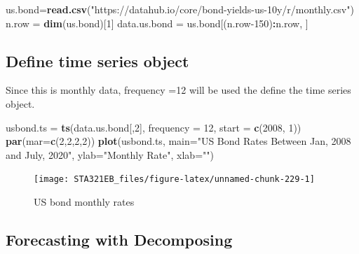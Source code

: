 \documentclass[
]{book}
\newenvironment{Shaded}{\begin{snugshade}}{\end{snugshade}}
\newcommand{\AttributeTok}[1]{\textcolor[rgb]{0.13,0.29,0.53}{#1}}
\newcommand{\DecValTok}[1]{\textcolor[rgb]{0.00,0.00,0.81}{#1}}
\newcommand{\FunctionTok}[1]{\textcolor[rgb]{0.13,0.29,0.53}{\textbf{#1}}}
\newcommand{\NormalTok}[1]{#1}
\newcommand{\OtherTok}[1]{\textcolor[rgb]{0.56,0.35,0.01}{#1}}
\newcommand{\SpecialCharTok}[1]{\textcolor[rgb]{0.81,0.36,0.00}{\textbf{#1}}}
\newcommand{\StringTok}[1]{\textcolor[rgb]{0.31,0.60,0.02}{#1}}
\begin{document}
\begin{Shaded}
\begin{Highlighting}[]
\NormalTok{us.bond}\OtherTok{=}\FunctionTok{read.csv}\NormalTok{(}\StringTok{"https://datahub.io/core/bond{-}yields{-}us{-}10y/r/monthly.csv"}\NormalTok{)}
\NormalTok{n.row }\OtherTok{=} \FunctionTok{dim}\NormalTok{(us.bond)[}\DecValTok{1}\NormalTok{]}
\NormalTok{data.us.bond }\OtherTok{=}\NormalTok{ us.bond[(n.row}\DecValTok{{-}150}\NormalTok{)}\SpecialCharTok{:}\NormalTok{n.row, ]}
\end{Highlighting}
\end{Shaded}

\hypertarget{define-time-series-object}{%
\subsection{Define time series object}\label{define-time-series-object}}

Since this is monthly data, frequency =12 will be used the define the time series object.

\begin{Shaded}
\begin{Highlighting}[]
\NormalTok{usbond.ts }\OtherTok{=} \FunctionTok{ts}\NormalTok{(data.us.bond[,}\DecValTok{2}\NormalTok{], }\AttributeTok{frequency =} \DecValTok{12}\NormalTok{, }\AttributeTok{start =} \FunctionTok{c}\NormalTok{(}\DecValTok{2008}\NormalTok{, }\DecValTok{1}\NormalTok{))}
\FunctionTok{par}\NormalTok{(}\AttributeTok{mar=}\FunctionTok{c}\NormalTok{(}\DecValTok{2}\NormalTok{,}\DecValTok{2}\NormalTok{,}\DecValTok{2}\NormalTok{,}\DecValTok{2}\NormalTok{))}
\FunctionTok{plot}\NormalTok{(usbond.ts, }\AttributeTok{main=}\StringTok{"US Bond Rates Between Jan, 2008 and July, 2020"}\NormalTok{, }\AttributeTok{ylab=}\StringTok{"Monthly Rate"}\NormalTok{, }\AttributeTok{xlab=}\StringTok{""}\NormalTok{)}
\end{Highlighting}
\end{Shaded}

\begin{figure}

{\centering \texttt{[image: STA321EB\_files/figure-latex/unnamed-chunk-229-1]} 

}

\caption{US bond monthly rates}\label{fig:unnamed-chunk-229}
\end{figure}

\hypertarget{forecasting-with-decomposing-1}{%
\subsection{Forecasting with Decomposing}\label{forecasting-with-decomposing-1}}
\end{document}
